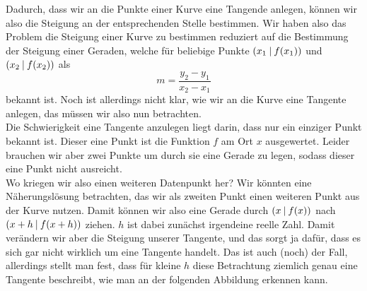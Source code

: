 \documentclass[../../main.tex]{subfiles}
\begin{document}
    \begin{center}\normalsize
    \end{center}
    Dadurch, dass wir an die Punkte einer Kurve eine Tangende anlegen, können wir also die Steigung an der entsprechenden Stelle bestimmen. Wir haben also das Problem die Steigung einer Kurve zu bestimmen reduziert auf die Bestimmung der Steigung einer Geraden, welche für beliebige Punkte $\left(x_1 \:\middle|\: f(x_1)\right)$ und $\left(x_2 \:\middle|\: f(x_2)\right)$ als
    \[m = \frac{y_2 - y_1}{x_2 - x_1}\]
    bekannt ist. Noch ist allerdings nicht klar, wie wir an die Kurve eine Tangente anlegen, das müssen wir also nun betrachten.\\
    Die Schwierigkeit eine Tangente anzulegen liegt darin, dass nur ein einziger Punkt bekannt ist. Dieser eine Punkt ist die Funktion $f$ am Ort $x$ ausgewertet. Leider brauchen wir aber zwei Punkte um durch sie eine Gerade zu legen, sodass dieser eine Punkt nicht ausreicht.\\
    Wo kriegen wir also einen weiteren Datenpunkt her? Wir könnten eine Näherungslösung betrachten, das wir als zweiten Punkt einen weiteren Punkt aus der Kurve nutzen. Damit können wir also eine Gerade durch $\left(x \:\middle|\: f(x)\right)$ nach $\left(x+h \:\middle|\: f(x+h)\right)$ ziehen. $h$ ist dabei zunächst irgendeine reelle Zahl. Damit verändern wir aber die Steigung unserer Tangente, und das sorgt ja dafür, dass es sich gar nicht wirklich um eine Tangente handelt. Das ist auch (noch) der Fall, allerdings stellt man fest, dass für kleine $h$ diese Betrachtung ziemlich genau eine Tangente beschreibt, wie man an der folgenden Abbildung erkennen kann.
    \begin{center}\normalsize
    \end{center}
             
\end{document}
